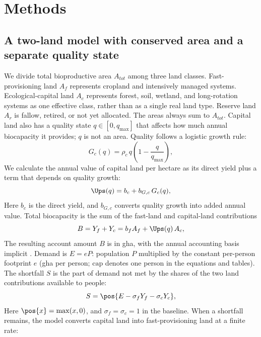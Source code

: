 \section{Methods}\label{sec:model}

\subsection{A two-land model with conserved area and a separate quality state}\label{sec:equations}

We divide total bioproductive area $A_{tot}$ among three land classes. Fast-provisioning land $A_f$ represents cropland and intensively managed systems. Ecological-capital land $A_c$ represents forest, soil, wetland, and long-rotation systems as one effective class, rather than as a single real land type. Reserve land $A_r$ is fallow, retired, or not yet allocated. The areas always sum to $A_{tot}$. Capital land also has a quality state $q\in[0,q_{\max}]$ that affects how much annual biocapacity it provides; $q$ is not an area. Quality follows a logistic growth rule:
\begin{equation}\label{eq:Gc}
G_c(q)=\rho_c\,q\left(1-\frac{q}{q_{\max}}\right),
\end{equation}
We calculate the annual value of capital land per hectare as its direct yield plus a term that depends on quality growth:
\begin{equation}\label{eq:Ups}
\Ups(q)=b_c+b_{G,c}\,G_c(q),
\end{equation}
Here $b_c$ is the direct yield, and $b_{G,c}$ converts quality growth into added annual value. Total biocapacity is the sum of the fast-land and capital-land contributions
\begin{equation}\label{eq:B}
B=Y_f+Y_c=b_f A_f+\Ups(q)\,A_c ,
\end{equation}
The resulting account amount $B$ is in gha, with the annual accounting basis implicit \citep{GFNStandards2009,GFNGuidebook2019}. Demand is $E=eP$: population $P$ multiplied by the constant per-person footprint $e$ (gha per person; $\mathrm{cap}$ denotes one person in the equations and tables). The shortfall $S$ is the part of demand not met by the shares of the two land contributions available to people:
\begin{equation}\label{eq:S}
S=\pos{E-\sigma_f Y_f-\sigma_c Y_c},
\end{equation}
Here $\pos{x}=\max(x,0)$, and $\sigma_f=\sigma_c=1$ in the baseline. When a shortfall remains, the model converts capital land into fast-provisioning land at a finite rate:

